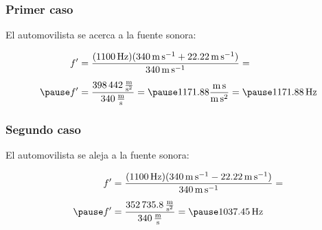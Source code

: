 \documentclass[14pt]{beamer}
\begin{document}
\begin{frame}
\frametitle{Primer caso}
El automovilista se acerca a la fuente sonora:

\pause
\begin{eqnarray*}
\begin{aligned}
\pderivada{f} &= \dfrac{(\SI{1100}{\hertz})(\SI{340}{\meter\per\second} + \SI{22.22}{\meter\per\second})}{\SI{340}{\meter\per\second}} = \\[0.5em] \pause
\pderivada{f} &= \dfrac{\SI[per-mode=fraction]{398442}{\meter\per\square\second}}{\SI[per-mode=fraction]{340}{\meter\per\second}} = \pause \num{1171.88} \dfrac{\unit{\meter\second}}{\unit{\meter\square\second}} = \pause \SI{1171.88}{\hertz}
\end{aligned}
\end{eqnarray*}
\end{frame}
\begin{frame}
\frametitle{Segundo caso}
El automovilista se aleja a la fuente sonora:

\pause
\begin{eqnarray*}
\begin{aligned}
\pderivada{f} &= \dfrac{(\SI{1100}{\hertz})(\SI{340}{\meter\per\second} - \SI{22.22}{\meter\per\second})}{\SI{340}{\meter\per\second}} = \\[0.5em] \pause
\pderivada{f} &= \dfrac{\SI[per-mode=fraction]{352735.8}{\meter\per\square\second}}{\SI[per-mode=fraction]{340}{\meter\per\second}} = \pause \SI{1037.45}{\hertz}
\end{aligned}
\end{eqnarray*}
\end{frame}
    
\end{document}
